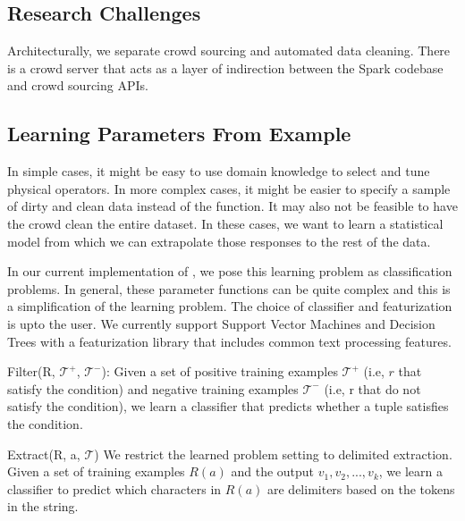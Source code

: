 \vspace{-0.25cm}


\iffalse
\subsection{Research Challenges}

Architecturally, we separate crowd sourcing and automated data cleaning.
There is a crowd server that acts as a layer of indirection between the Spark codebase and crowd sourcing APIs.




\subsection{Learning Parameters From Example}
In simple cases, it might be easy to use domain knowledge to select and tune physical operators. 
In more complex cases, it might be easier to specify a sample of dirty and clean data instead of the function.
It may also not be feasible to have the crowd clean the entire dataset.
In these cases, we want to learn a statistical model from which we can extrapolate those responses to the rest 
of the data.

In our current implementation of \projx, we pose this learning problem as classification problems.
In general, these parameter functions can be quite complex and this is a simplification of the learning problem.
The choice of classifier and featurization is upto the user. 
We currently support Support Vector Machines and Decision Trees with a featurization library that includes common text processing features.

\vspace{0.5em}

\noindent \textsf{Filter(R, $\mathcal{T}^+$, $\mathcal{T}^-$)}: Given a set of positive training examples $\mathcal{T}^+$ (i.e, $r$ that satisfy the condition) and
negative training examples $\mathcal{T}^-$ (i.e, r that do not satisfy the condition), we learn a classifier that predicts whether a tuple satisfies the condition. 

\vspace{0.5em}

\noindent \textsf{Extract(R, a, $\mathcal{T}$)} We restrict the learned problem setting to delimited extraction. Given a set of training examples $R(a)$ and the output $v_1,v_2,...,v_k$, we learn a classifier to predict which characters in $R(a)$ are delimiters based on the tokens in the string.

